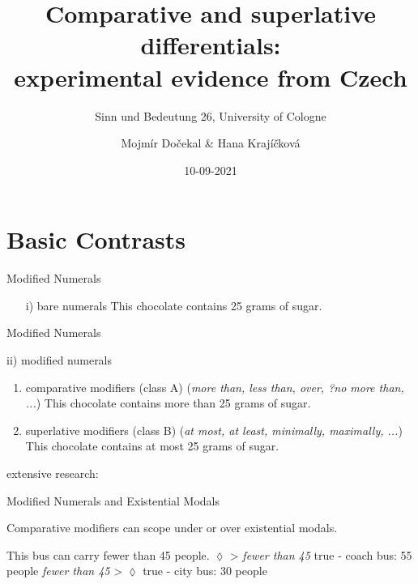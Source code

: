 \documentclass[10pt
]{beamer}
\title[Comparative and superlative differentials:\\
experimental evidence from Czech]{Comparative and superlative differentials:\\
experimental evidence from Czech}
\subtitle[SuB 26, University of Cologne]{Sinn und Bedeutung 26, University of Cologne}
\author[Mojmír Dočekal]{Mojmír Dočekal \& Hana Krajíčková}
\institute[FF MUNI]{Masaryk University}
\date{10-09-2021}
\begin{document}
\begin{frame}[plain]
\maketitle
\end{frame}

\section{Basic Contrasts}
\begin{frame}{Modified Numerals}

\begin{enumerate}
    \item[i)] \alert{bare numerals}
    \pex
    This chocolate contains 25 grams of sugar.
    \xe

\end{enumerate}
\end{frame}

\begin{frame}{Modified Numerals}

ii) \alert{modified numerals}

\begin{enumerate}
    \item \alert{comparative modifiers (class A)} (\textit{more than, less than, over, ?no more than, ...})
    \pex
    This chocolate contains more than 25 grams of sugar.
    \xe
    \item \alert{superlative modifiers (class B)} (\textit{at most, at least, minimally, maximally, ...})
    \pex
    This chocolate contains at most 25 grams of sugar.
    \xe
\end{enumerate}

\footnotesize
extensive research: \cite{buring2008least,geurts2007least,nouwen2008upper,nouwen2010two,cummins2010comparative,kennedy2015fregean,alexandropoulou2016pragmatic}


\end{frame}


\begin{frame}{Modified Numerals and Existential Modals}

Comparative modifiers can scope under or over existential modals.


\pex This bus can carry fewer than 45 people.
  \a $\lozenge$ > \textit{fewer than 45} \hfill true - coach bus: 55 people
  \a \textit{fewer than 45} > $\lozenge$ \hfill true - city bus: 30 people
  \xe


\end{frame}
\end{document}
